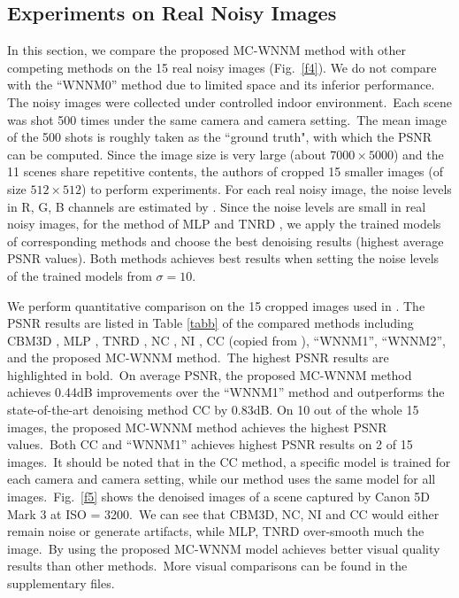 \documentclass[10pt,twocolumn,letterpaper,sort&compress]{article}
\begin{document}
\subsection{Experiments on Real Noisy Images}

In this section, we compare the proposed MC-WNNM method with other competing methods on the 15 real noisy images (Fig.\ \ref{f4}). We do not compare with the ``WNNM0'' method due to limited space and its inferior performance. The noisy images were collected under controlled indoor environment.\ Each scene was shot 500 times under the same camera and camera setting.\ The mean image of the 500 shots is roughly taken as the ``ground truth", with which the PSNR can be computed. Since the image size is very large (about $7000\times5000$) and the 11 scenes share repetitive contents, the authors of \cite{crosschannel2016} cropped 15 smaller images (of size $512\times512$) to perform experiments. For each real noisy image, the noise levels in R, G, B channels are estimated by \cite{Chen2015ICCV}. Since the noise levels are small in real noisy images, for the method of MLP \cite{mlp} and TNRD \cite{chen2015learning}, we apply the trained models of corresponding methods and choose the best denoising results (highest average PSNR values). Both methods achieves best results when setting the noise levels of the trained models from $\sigma=10$.  

We perform quantitative comparison on the 15 cropped images used in \cite{crosschannel2016}. The PSNR results are listed in Table \ref{tabb} of the compared methods including CBM3D \cite{cbm3d}, MLP \cite{mlp}, TNRD \cite{chen2015learning}, NC \cite{noiseclinic,ncwebsite}, NI \cite{neatimage},
CC \cite{crosschannel2016} (copied from \cite{crosschannel2016}), ``WNNM1'', ``WNNM2'', and the proposed MC-WNNM method.\ The highest PSNR results are highlighted in bold.\ On average PSNR, the proposed MC-WNNM method achieves 0.44dB improvements over the ``WNNM1'' method and outperforms the state-of-the-art denoising method CC \cite{crosschannel2016} by 0.83dB. On 10 out of the whole 15 images, the proposed MC-WNNM method achieves the highest PSNR values.\ Both CC and ``WNNM1'' achieves highest PSNR results on 2 of 15 images.\ It should be noted that in the CC method, a specific model is trained for each camera and camera setting, while our method uses the same model for all images.\ Fig.\ \ref{f5} shows the denoised images of a scene captured by Canon 5D Mark 3 at ISO = 3200.\ We can see that CBM3D, NC, NI and CC would either remain noise or generate artifacts, while MLP, TNRD over-smooth much the image.\ By using the proposed MC-WNNM model achieves better visual quality results than other methods.\ More visual comparisons can be found in the supplementary files.
\end{document}
